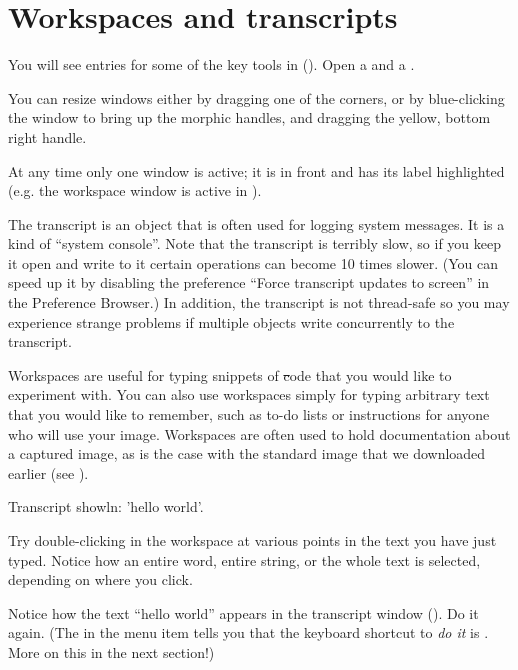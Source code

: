 \documentclass[a4paper,10pt,twoside]{book}
\begin{document}
\section{Workspaces and transcripts}
\label{sec:transcript}

You will see entries for some of the key tools in \sq ().
Open a  and a .

You can resize windows either by dragging one of the corners, or by blue-clicking the window to bring up the morphic handles, and dragging the yellow, bottom right handle.

At any time only one window is active; it is in front and has its label highlighted (e.g. the workspace window is active in ).

The transcript is an object that is often used for logging system messages.
It is a kind of ``system console''.
Note that the transcript is terribly slow, so if you keep it open and write to it certain operations can become 10 times slower.
(You can speed up it by disabling the preference ``Force transcript updates to screen'' in the Preference Browser.)
In addition, the transcript is not thread-safe so you may experience strange problems if multiple objects write concurrently to the transcript.

Workspaces are useful for typing snippets of \st code that you would like to experiment with.
You can also use workspaces simply for typing arbitrary text that you would like to remember, such as to-do lists or instructions for anyone who will use your image.
Workspaces are often used to hold documentation about a captured image, as is the case with the standard image that we downloaded earlier (see ).

\begin{code}{}
Transcript showln: 'hello world'.
\end{code}

Try double-clicking in the workspace at various points in the text you have just typed.
Notice how an entire word, entire string, or the whole text is selected, depending on where you click.

Notice how the text ``hello world'' appears in the transcript window
().
Do it again.
(The  in the menu item  tells you that the keyboard shortcut to \emph{do it} is .
More on this in the next section!)
\end{document}
